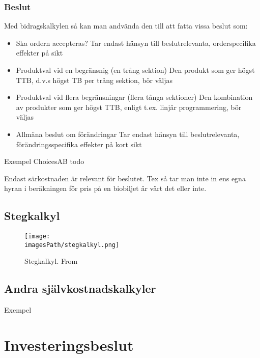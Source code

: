 \subsubsection{Beslut}
Med bidragskalkylen så kan man andvända den till att fatta vissa beslut som:
\begin{itemize}
    \item Ska ordern accepteras? \newline
    Tar endast hänsyn till beslutrelevanta, orderspecifika effekter på sikt
    \item Produktval vid en begränsnig (en trång sektion) \newline
    Den produkt som ger högst TTB, d.v.s högst TB per trång sektion, bör väljas
    \item Produktval vid flera begränsningar (flera tånga sektioner) \newline
    Den kombination av produkter som ger högst TTB, enligt t.ex. linjär programmering, bör väljas
    \item Allmäna beslut om förändringar \newline
    Tar endast hänsyn till beslutrelevanta, förändringsspecifika effekter på kort sikt
\end{itemize}


\begin{exampleblock}{Exempel ChoicesAB}
    todo
    
    Endast särkostnaden är relevant för beslutet. Tex så tar man inte in ens egna hyran i 
    beräkningen för pris på en biobiljet är värt det eller inte.
\end{exampleblock}

\subsection{Stegkalkyl}
\begin{figure}[H]
    \centering
    \texttt{[image: \\imagesPath/stegkalkyl.png]}
    \caption{Stegkalkyl. From \cite{im}}
\end{figure}


\subsection{Andra självkostnadskalkyler}
Exempel

\section{Investeringsbeslut}

